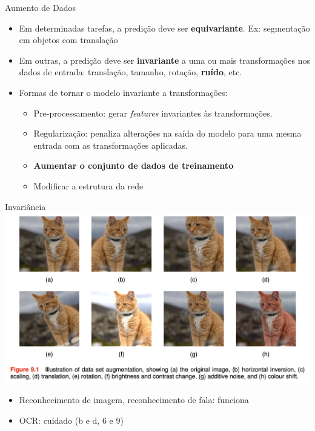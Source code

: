 \documentclass{beamer}
\begin{document}
\begin{frame}{Aumento de Dados}
\begin{itemize}
  
  \item Em determinadas tarefas, a predição deve ser \textbf{equivariante}. Ex: segmentação em objetos com translação

  \item Em outras, a predição deve ser \textbf{invariante} a uma ou mais transformações nos dados de entrada: translação, tamanho, rotação, \textbf{ruído}, etc.
  \item Formas de tornar o modelo invariante a transformações:
    \begin{itemize}
      \item Pre-processamento: gerar \textit{features} invariantes às transformações.
      \item Regularização: penaliza alterações na saída do modelo para uma mesma entrada com as transformações aplicadas.
      \item \textbf{Aumentar o conjunto de dados de treinamento}
      \item Modificar a estrutura da rede
    \end{itemize}
\end{itemize}
\end{frame}


\begin{frame}{Invariância}
\centering
\includegraphics[width=\textwidth,height=0.5\textheight,keepaspectratio]{imgs/bishop_example/8.png}
\begin{itemize}
  \item Reconhecimento de imagem, reconhecimento de fala: funciona 
\item OCR: cuidado (b e d, 6 e 9)
\end{itemize}
\end{frame}
\end{document}
